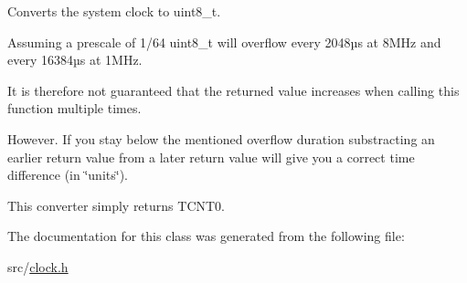 Converts the system clock to {\ttfamily uint8\+\_\+t}. 

Assuming a prescale of 1/64 {\ttfamily uint8\+\_\+t} will overflow every 2\textquotesingle{}048µs at 8\+M\+Hz and every 16\textquotesingle{}384µs at 1\+M\+Hz.

It is therefore not guaranteed that the returned value increases when calling this function multiple times.

However. If you stay below the mentioned overflow duration substracting an earlier return value from a later return value will give you a correct time difference (in \char`\"{}units\char`\"{}).

This converter simply returns {\ttfamily T\+C\+N\+T0}. 

The documentation for this class was generated from the following file\+:\begin{DoxyCompactItemize}
\item 
src/\hyperlink{clock_8h}{clock.\+h}\end{DoxyCompactItemize}
